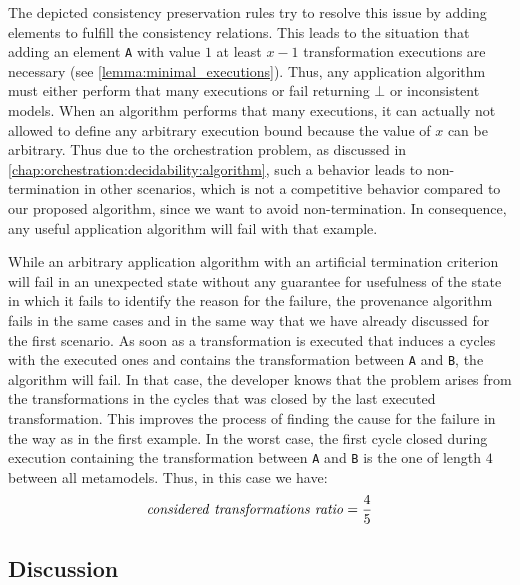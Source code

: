 The depicted consistency preservation rules try to resolve this issue by adding elements to fulfill the consistency relations.
This leads to the situation that adding an element \texttt{A} with value $1$ at least $x-1$ transformation executions are necessary (see \autoref{lemma:minimal_executions}).
Thus, any application algorithm must either perform that many executions or fail returning $\bot$ or inconsistent models.
When an algorithm performs that many executions, it can actually not allowed to define any arbitrary execution bound because the value of $x$ can be arbitrary.
Thus due to the orchestration problem, as discussed in \autoref{chap:orchestration:decidability:algorithm}, such a behavior leads to non-termination in other scenarios, which is not a competitive behavior compared to our proposed algorithm, since we want to avoid non-termination.
In consequence, any useful application algorithm will fail with that example.

While an arbitrary application algorithm with an artificial termination criterion will fail in an unexpected state without any guarantee for usefulness of the state in which it fails to identify the reason for the failure, the provenance algorithm fails in the same cases and in the same way that we have already discussed for the first scenario.
As soon as a transformation is executed that induces a cycles with the executed ones and contains the transformation between \texttt{A} and \texttt{B}, the algorithm will fail.
In that case, the developer knows that the problem arises from the transformations in the cycles that was closed by the last executed transformation.
This improves the process of finding the cause for the failure in the way as in the first example.
In the worst case, the first cycle closed during execution containing the transformation between \texttt{A} and \texttt{B} is the one of length $4$ between all metamodels.
Thus, in this case we have:
\begin{align*}
    \mathit{considered\ transformations\ ratio} = \frac{4}{5}
\end{align*}


\subsection{Discussion}
\label{chap:correctness_evaluation:orchestration:discussion}


